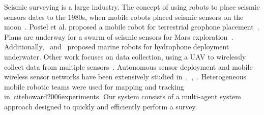 Seismic surveying is a large industry.
The concept of using robots to place seismic sensors dates to the 1980s, when mobile robots placed seismic sensors on the moon~\cite{LSisMSE81}. Postel et al. proposed a mobile robot for terrestrial geophone placement~\cite{DSSMaA14}. Plans are underway for a swarm of seismic sensors for Mars exploration~\cite{MAPL2006}.
Additionally,~\cite{muyzert2015marine} and~\cite{postel2014drone} proposed marine robots for hydrophone deployment underwater. 
Other work  focuses on data collection, using a UAV to wirelessly collect data from multiple sensors~\cite{wilcox2013seismic}. Autonomous sensor deployment and mobile wireless sensor networks have been extensively studied in~\cite{howard2002mobile},~\cite{corke2004autonomous},~\cite{tuna2014autonomous}. Heterogeneous mobile robotic teams were used for mapping and tracking in~cite{howard2006experiments}.
Our system consists of a multi-agent system approach designed to quickly and efficiently perform a survey.

